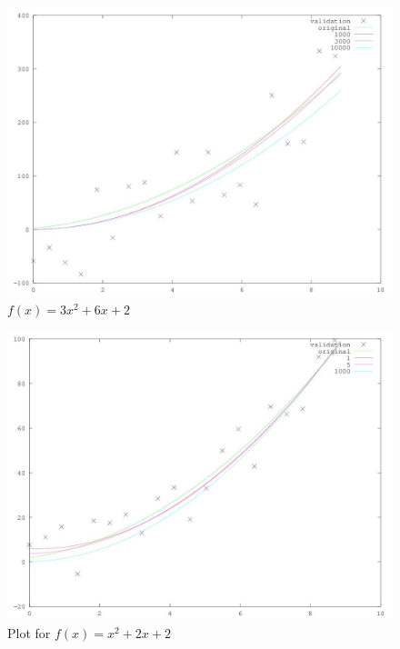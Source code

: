 \documentclass[12pt]{article}
\begin{document}
	\begin{figure}[h]
		\centering
		\includegraphics[scale=0.7]{plot}
		\caption{$f(x) = 3x^2 + 6x + 2$}
		\label{fig:plot}
	\end{figure}
	\begin{figure}
		\centering
		\includegraphics[scale=0.7]{small_f_plot}
		\caption{Plot for $f(x) = x^2 + 2x + 2$}
		\label{fig:small_f_plot}
	\end{figure}
\end{document}
